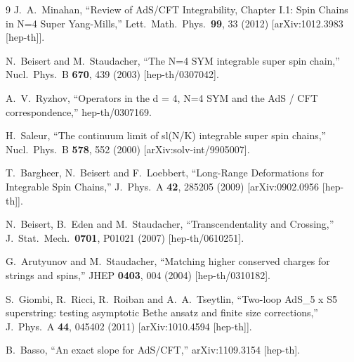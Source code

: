 \documentclass[a4paper,11pt]{article}
\numberwithin{equation}{section}
\begin{document}
\begin{thebibliography} {9}
  J.~A.~Minahan,
  ``Review of AdS/CFT Integrability, Chapter I.1: Spin Chains in N=4 Super Yang-Mills,''
  Lett.\ Math.\ Phys.\  {\bf 99}, 33 (2012)
  [arXiv:1012.3983 [hep-th]].

  N.~Beisert and M.~Staudacher,
  ``The N=4 SYM integrable super spin chain,''
  Nucl.\ Phys.\ B {\bf 670}, 439 (2003)
  [hep-th/0307042].

  A.~V.~Ryzhov,
  ``Operators in the d = 4, N=4 SYM and the AdS / CFT correspondence,''
  hep-th/0307169.

	H.~Saleur, 
	``The continuum limit of sl(N/K) integrable super spin chains,'' 
	Nucl.\ Phys.\ B {\bf 578}, 552 (2000) 
	[arXiv:solv-int/9905007].

  T.~Bargheer, N.~Beisert and F.~Loebbert,
  ``Long-Range Deformations for Integrable Spin Chains,''
  J.\ Phys.\ A {\bf 42}, 285205 (2009)
  [arXiv:0902.0956 [hep-th]].

  N.~Beisert, B.~Eden and M.~Staudacher,
  ``Transcendentality and Crossing,''
  J.\ Stat.\ Mech.\  {\bf 0701}, P01021 (2007)
  [hep-th/0610251].

  G.~Arutyunov and M.~Staudacher,
  ``Matching higher conserved charges for strings and spins,''
  JHEP {\bf 0403}, 004 (2004)
  [hep-th/0310182].

  S.~Giombi, R.~Ricci, R.~Roiban and A.~A.~Tseytlin,
  ``Two-loop AdS\_5 x S\^5 superstring: testing asymptotic Bethe ansatz and finite size corrections,''
  J.\ Phys.\ A {\bf 44}, 045402 (2011)
  [arXiv:1010.4594 [hep-th]].

  B.~Basso,
  ``An exact slope for AdS/CFT,''
  arXiv:1109.3154 [hep-th].


\end{thebibliography}
\end{document}
